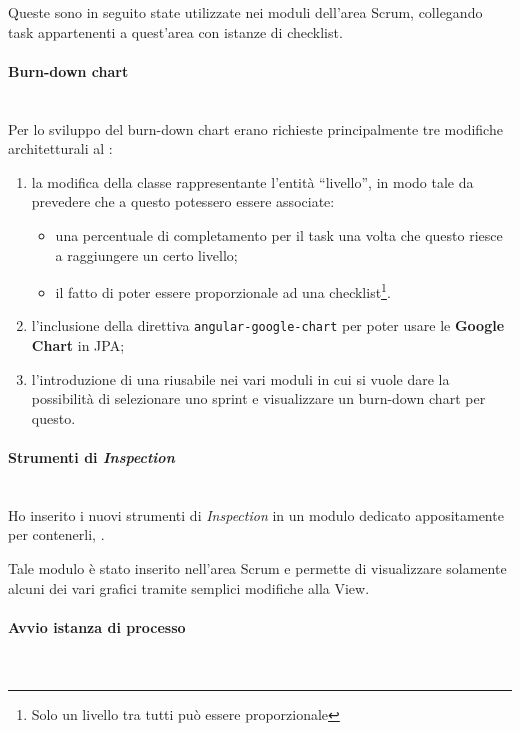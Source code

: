 Queste  sono in seguito state utilizzate nei moduli
dell'area Scrum, collegando task appartenenti a quest'area con istanze di
checklist.

\paragraph{Burn-down chart} \mbox{} \\

Per lo sviluppo del burn-down chart erano richieste principalmente tre
modifiche architetturali al \FREND:

\begin{enumerate}
\item la modifica della classe rappresentante l'entità ``livello'', in modo 
  tale da prevedere che a questo potessero essere associate:
  \begin{itemize}
  \item una percentuale di completamento per il task una volta che questo
    riesce a raggiungere un certo livello;
  \item il fatto di poter essere proporzionale ad una checklist\footnote{Solo
    un livello tra tutti può essere proporzionale}.
  \end{itemize}
\item l'inclusione della direttiva \texttt{angular-google-chart} per poter
  usare le \textbf{Google Chart } in JPA;
\item l'introduzione di una  riusabile nei vari moduli in cui
  si vuole dare la possibilità di selezionare uno sprint e visualizzare un
  burn-down chart per questo.
\end{enumerate}

\paragraph{Strumenti di \emph{Inspection}} \mbox{} \\

Ho inserito i nuovi strumenti di \emph{Inspection} in un modulo dedicato
appositamente per contenerli, .

Tale modulo è stato inserito nell'area Scrum e permette di visualizzare
solamente alcuni dei vari grafici tramite semplici modifiche alla View.

\paragraph{Avvio istanza di processo} \mbox{} \\

